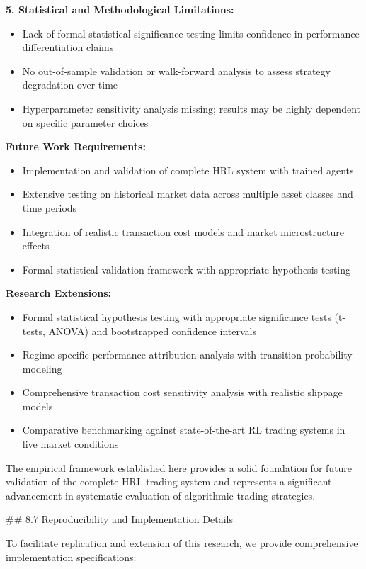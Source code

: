\documentclass[11pt,a4paper]{article}
\begin{document}
\textbf{5. Statistical and Methodological Limitations:}
\begin{itemize}
\item Lack of formal statistical significance testing limits confidence in performance differentiation claims
\item No out-of-sample validation or walk-forward analysis to assess strategy degradation over time
\item Hyperparameter sensitivity analysis missing; results may be highly dependent on specific parameter choices

\end{itemize}
\textbf{Future Work Requirements:}
\begin{itemize}
\item Implementation and validation of complete HRL system with trained agents
\item Extensive testing on historical market data across multiple asset classes and time periods
\item Integration of realistic transaction cost models and market microstructure effects
\item Formal statistical validation framework with appropriate hypothesis testing

\end{itemize}
\textbf{Research Extensions:}
\begin{itemize}
\item Formal statistical hypothesis testing with appropriate significance tests (t-tests, ANOVA) and bootstrapped confidence intervals
\item Regime-specific performance attribution analysis with transition probability modeling
\item Comprehensive transaction cost sensitivity analysis with realistic slippage models
\item Comparative benchmarking against state-of-the-art RL trading systems in live market conditions

\end{itemize}
The empirical framework established here provides a solid foundation for future validation of the complete HRL trading system and represents a significant advancement in systematic evaluation of algorithmic trading strategies.

\#\# 8.7 Reproducibility and Implementation Details

To facilitate replication and extension of this research, we provide comprehensive implementation specifications:
\end{document}
